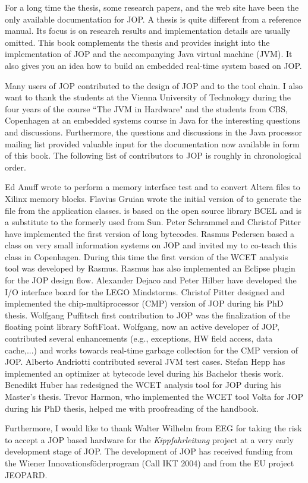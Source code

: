 For a long time the thesis, some research papers, and the web site
have been the only available documentation for JOP. A thesis is quite
different from a reference manual. Its focus is on research results
and implementation details are usually omitted. This book complements
the thesis and provides insight into the implementation of JOP and
the accompanying Java virtual machine (JVM). It also gives you an
idea how to build an embedded real-time system based on JOP.


Many users of JOP contributed to the design of JOP and to the tool
chain. I also want to thank the students at the Vienna University of
Technology during the four years of the course ``The JVM in Hardware"
and the students from CBS, Copenhagen at an embedded systems course
in Java for the interesting questions and discussions. Furthermore,
the questions and discussions in the Java processor mailing list
provided valuable input for the documentation now available in form
of this book. The following list of contributors to JOP is roughly in
chronological order.

Ed Anuff wrote  to perform a memory interface test
and  to convert Altera  files to
Xilinx memory blocks.
Flavius Gruian wrote the initial version of  to generate
the  file from the application classes.  is
based on the open source library BCEL and is a substitute to the
formerly used  from Sun. Peter Schrammel and
Christof Pitter have implemented the first version of long bytecodes.
Rasmus Pedersen based a class on very small information systems on
JOP and invited my to co-teach this class in Copenhagen. During this
time the first version of the WCET analysis tool was developed by
Rasmus. Rasmus has also implemented an Eclipse plugin for the JOP
design flow. Alexander Dejaco and Peter Hilber have developed the I/O
interface board for the LEGO Mindstorms. Christof Pitter designed and
implemented the chip-multiprocessor (CMP) version of JOP during his
PhD thesis. Wolfgang Puffitsch first contribution to JOP was the
finalization of the floating point library SoftFloat. Wolfgang, now
an active developer of JOP, contributed several enhancements (e.g.,
exceptions, HW field access, data cache,...) and works towards
real-time garbage collection for the CMP version of JOP. Alberto
Andriotti contributed several JVM test cases. Stefan Hepp has
implemented an optimizer at bytecode level during his Bachelor thesis
work. Benedikt Huber has redesigned the WCET analysis tool for JOP
during his Master's thesis. Trevor Harmon, who implemented the WCET
tool Volta for JOP during his PhD thesis, helped me with proofreading
of the handbook.

Furthermore, I would like to thank Walter Wilhelm from EEG for taking
the risk to accept a JOP based hardware for the
\emph{Kippfahrleitung} project at a very early development stage of
JOP. The development of JOP has received funding from the Wiener
Innovationsf\"oderprogram (Call IKT 2004) and from the EU project
JEOPARD.
